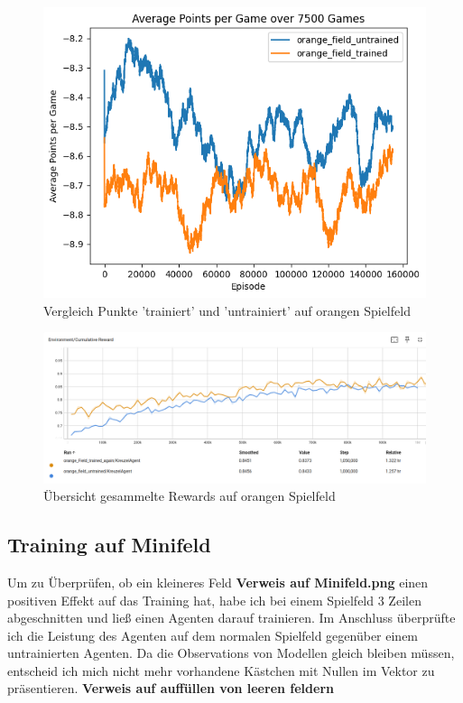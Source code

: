 \begin{figure}[!h]
    \centering
    \includegraphics[scale=0.6]{Bilder/points_orange_field.png}
    \caption{Vergleich Punkte 'trainiert' und 'untrainiert' auf orangen Spielfeld}
    \label{fig:orange_points}
\end{figure}
\begin{figure}[!h]
    \centering
    \includegraphics[scale=0.3]{Bilder/rewards_orange_field.png}
    \caption{Übersicht gesammelte Rewards auf orangen Spielfeld}
    \label{fig:orange_rewards}

\end{figure}

\subsection{Training auf Minifeld}
Um zu Überprüfen, ob ein kleineres Feld \textbf{Verweis auf Minifeld.png} einen positiven Effekt auf das Training hat, habe ich bei einem Spielfeld 3 Zeilen abgeschnitten und ließ einen Agenten darauf trainieren.
Im Anschluss überprüfte ich die Leistung des Agenten auf dem normalen Spielfeld gegenüber einem untrainierten Agenten. Da die Observations von Modellen gleich bleiben müssen, entscheid ich mich nicht mehr vorhandene Kästchen mit Nullen im Vektor zu präsentieren. \textbf{Verweis auf auffüllen von leeren feldern}

